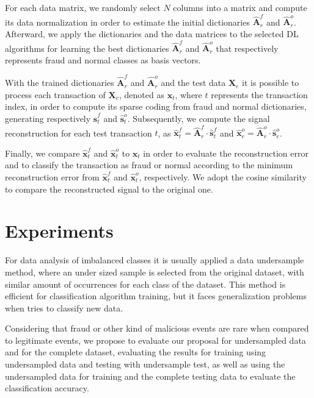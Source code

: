 For each data matrix, we randomly select $N$ columns into a matrix and compute its data normalization in order to estimate the initial dictionaries $\hat{\textbf{A}}_r^f$ and $\hat{\textbf{A}}_r^o$. Afterward, we apply the dictionaries and the data matrices to the selected DL algorithms for learning the best dictionaries $\hat{\textbf{A}}_r^f$ and $\hat{\textbf{A}}_r^o$ that respectively represents fraud and normal classes as basis vectors.

With the trained dictionaries $\hat{\textbf{A}}_r^f$ and $\hat{\textbf{A}}_r^o$ and the test data $\textbf{X}_e$ it is possible to process each transaction of $\textbf{X}_e$, denoted as $\textbf{x}_t$, where $t$ represents the transaction index, in order to compute its sparse coding from fraud and normal dictionaries, generating respectively $\hat{\textbf{s}}_t^f$ and $\hat{\textbf{s}}_t^o$. Subsequently, we compute the signal reconstruction for each test transaction $t$, as $\hat{\textbf{x}}_t^f = \hat{\textbf{A}}_r^f \cdot \hat{\textbf{s}}_t^f$ and $\hat{\textbf{x}}_e^o = \hat{\textbf{A}}_r^o \cdot \hat{\textbf{s}}_e^o$. 

Finally, we compare $\hat{\textbf{x}}_t^f$ and $\hat{\textbf{x}}_t^o$ to $\textbf{x}_t$ in order to evaluate the reconstruction error and to classify the transaction as fraud or normal according to the minimum reconstruction error from $\hat{\textbf{x}}_t^f$ and $\hat{\textbf{x}}_t^o$, respectively. We adopt the cosine similarity to compare the reconstructed signal to the original one. 


\section{Experiments}
\label{sec:4_experiments}

For data analysis of imbalanced classes it is usually applied a data undersample method, where an under sized sample is selected from the original dataset, with similar amount of occurrences for each class of the dataset. This method is efficient for classification algorithm training, but it faces generalization problems when tries to classify new data. 

Considering that fraud or other kind of malicious events are rare when compared to legitimate events, we propose to evaluate our proposal for undersampled data and for the complete dataset, evaluating the results for training using undersampled data and testing with undersample test, as well as using the undersampled data for training and the complete testing data to evaluate the classification accuracy.

